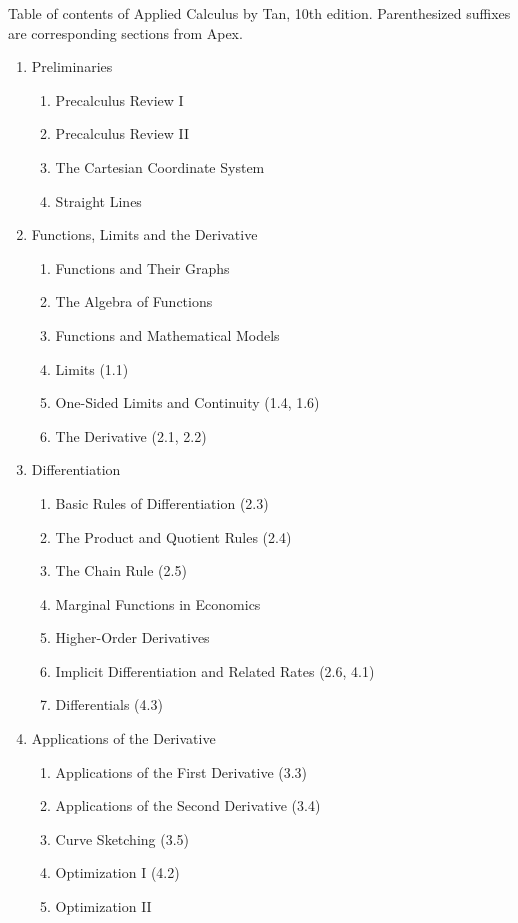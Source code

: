 \documentclass{amsart}
\begin{document}
Table of contents of Applied Calculus by Tan, 10th edition.  Parenthesized suffixes are corresponding sections from Apex.

\begin{enumerate}
\item Preliminaries
    \begin{enumerate}
    \item Precalculus Review I
    \item Precalculus Review II
    \item The Cartesian Coordinate System
    \item Straight Lines
    \end{enumerate}
\item Functions, Limits and the Derivative
    \begin{enumerate}
    \item Functions and Their Graphs
    \item The Algebra of Functions
    \item Functions and Mathematical Models
    \item Limits (1.1)
    \item One-Sided Limits and Continuity (1.4, 1.6)
    \item The Derivative (2.1, 2.2)
    \end{enumerate}
\item Differentiation
	\begin{enumerate}
	\item Basic Rules of Differentiation (2.3)
	\item The Product and Quotient Rules (2.4)
	\item The Chain Rule (2.5)
	\item Marginal Functions in Economics
	\item Higher-Order Derivatives
	\item Implicit Differentiation and Related Rates (2.6, 4.1)
	\item Differentials (4.3)
	\end{enumerate}
\item Applications of the Derivative
	\begin{enumerate}
	\item Applications of the First Derivative (3.3)
	\item Applications of the Second Derivative (3.4)
	\item Curve Sketching (3.5)
	\item Optimization I (4.2)
	\item Optimization II

\end{enumerate}
\end{enumerate}
\end{document}

